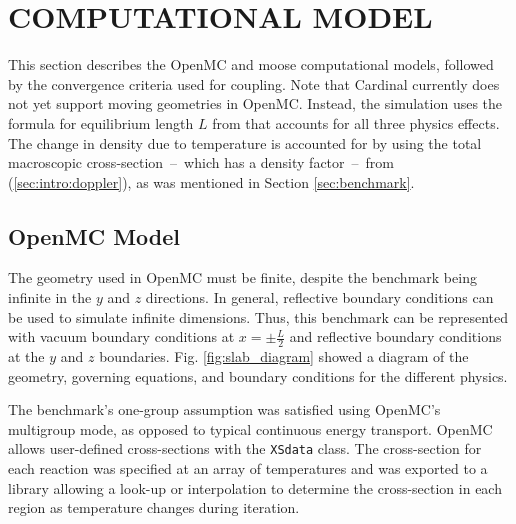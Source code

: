 \documentclass[letterpaper]{mc2023}
\begin{document}
\section{COMPUTATIONAL MODEL}
\label{sec:model}
This section describes the OpenMC and \gls{moose} computational models, followed by the convergence criteria used for coupling.
Note that Cardinal currently does not yet support moving geometries in OpenMC. Instead, the simulation uses the formula for
equilibrium length $L$ from \cite{analytical_benchmark} that accounts for all three physics effects. The change in density due
to temperature is accounted for by using the total macroscopic cross-section\ --\ which has a density factor\ --\ from
(\ref{sec:intro:doppler}), as was mentioned in Section \ref{sec:benchmark}.

\subsection{OpenMC Model}
The geometry used in OpenMC must be finite, despite the benchmark being infinite in the $y$ and $z$ directions. In general,
reflective boundary conditions can be used to simulate infinite dimensions. Thus, this benchmark can be represented with
vacuum boundary conditions at $x=\pm \frac{L}{2}$ and reflective boundary conditions at the $y$ and $z$ boundaries. Fig.
\ref{fig:slab_diagram} showed a diagram of the geometry, governing equations, and boundary conditions for the different physics.

The benchmark's one-group assumption was satisfied using OpenMC's multigroup mode, as opposed to typical continuous energy
transport. OpenMC allows user-defined cross-sections with the \texttt{XSdata} class. The cross-section for each reaction was
specified at an array of temperatures and was exported to a library allowing a look-up or interpolation to determine the
cross-section in each region as temperature changes during iteration.
\end{document}
